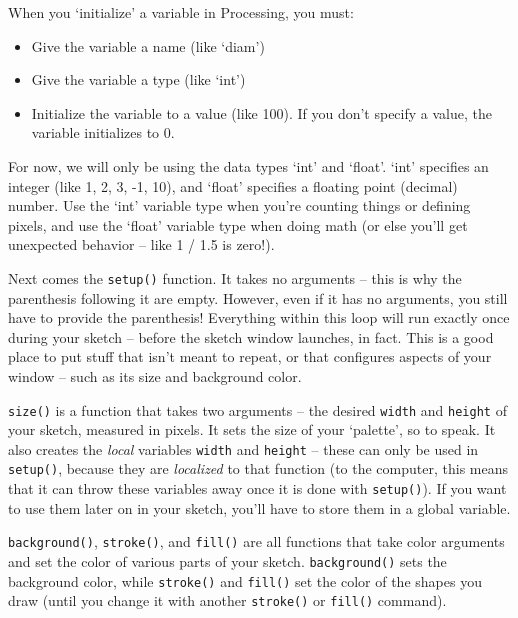 When you `initialize' a variable in Processing, you must:
\begin{itemize}
\item Give the variable a name (like `diam')
\item Give the variable a type (like `int')
\item Initialize the variable to a value (like 100).  If you don't specify a value, the variable initializes to 0.
\end{itemize}

For now, we will only be using the data types `int' and `float'.  `int' specifies an integer (like 1, 2, 3, -1, 10), and `float' specifies a floating point (decimal) number.  Use the `int' variable type when you're counting things or defining pixels, and use the `float' variable type when doing math (or else you'll get unexpected behavior -- like 1 / 1.5 is zero!).

Next comes the \texttt{setup()} function.  It takes no arguments -- this is why the parenthesis following it are empty.  However, even if it has no arguments, you still have to provide the parenthesis!  Everything within this loop will run exactly once during your sketch -- before the sketch window launches, in fact.  This is a good place to put stuff that isn't meant to repeat, or that configures aspects of your window -- such as its size and background color.

\texttt{size()} is a function that takes two arguments -- the desired \texttt{width} and \texttt{height} of your sketch, measured in pixels.  It sets the size of your `palette', so to speak.  It also creates the \emph{local} variables \texttt{width} and \texttt{height} -- these can only be used in \texttt{setup()}, because they are \emph{localized} to that function (to the computer, this means that it can throw these variables away once it is done with \texttt{setup()}).  If you want to use them later on in your sketch, you'll have to store them in a global variable.

\texttt{background()}, \texttt{stroke()}, and \texttt{fill()} are all functions that take color arguments and set the color of various parts of your sketch.  \texttt{background()} sets the background color, while \texttt{stroke()} and \texttt{fill()} set the color of the shapes you draw (until you change it with another \texttt{stroke()} or \texttt{fill()} command).


